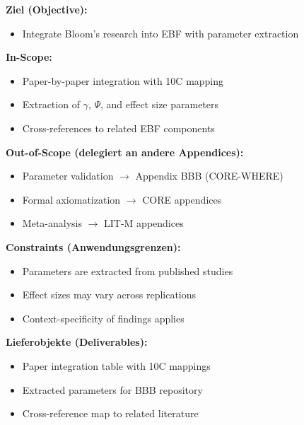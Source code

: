 
\begin{tcolorbox}[
    colback=orange!5!white,
    colframe=orange!75!black,
    title={\textbf{Appendix Scope: Ziel / In-Scope / Out-of-Scope / Constraints}},
    fonttitle=\bfseries
]

\textbf{Ziel (Objective):}
\begin{itemize}[nosep]
    \item Integrate Bloom's research into EBF with parameter extraction
\end{itemize}

\textbf{In-Scope:}
\begin{itemize}[nosep]
    \item Paper-by-paper integration with 10C mapping
    \item Extraction of $\gamma$, $\Psi$, and effect size parameters
    \item Cross-references to related EBF components
\end{itemize}

\textbf{Out-of-Scope (delegiert an andere Appendices):}
\begin{itemize}[nosep]
    \item Parameter validation $\rightarrow$ Appendix BBB (CORE-WHERE)
    \item Formal axiomatization $\rightarrow$ CORE appendices
    \item Meta-analysis $\rightarrow$ LIT-M appendices
\end{itemize}

\textbf{Constraints (Anwendungsgrenzen):}
\begin{itemize}[nosep]
    \item Parameters are extracted from published studies
    \item Effect sizes may vary across replications
    \item Context-specificity of findings applies
\end{itemize}

\textbf{Lieferobjekte (Deliverables):}
\begin{itemize}[nosep]
    \item Paper integration table with 10C mappings
    \item Extracted parameters for BBB repository
    \item Cross-reference map to related literature
\end{itemize}

\end{tcolorbox}

